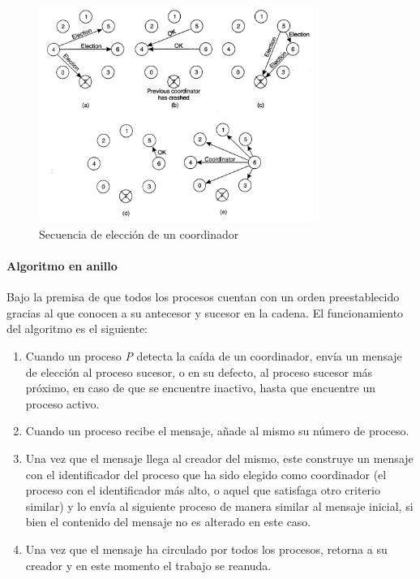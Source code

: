 \begin{figure}[H]
\centering
\includegraphics[width=0.8\textwidth]{Chapter2/Figures/bully}
\caption{Secuencia de elección de un coordinador}
\label{fig:tanenbaum:bully}
\end{figure}

\paragraph{Algoritmo en anillo}

Bajo la premisa de que todos los procesos cuentan con un orden preestablecido gracias al que conocen a su antecesor y sucesor en la cadena. El funcionamiento del algoritmo es el siguiente:

\begin{enumerate}
\item Cuando un proceso \textit{P} detecta la caída de un coordinador, envía un mensaje de elección al proceso sucesor, o en su defecto, al proceso sucesor más próximo, en caso de que se encuentre inactivo, hasta que encuentre un proceso activo.
\item Cuando un proceso recibe el mensaje, añade al mismo su número de proceso.
\item Una vez que el mensaje llega al creador del mismo, este construye un mensaje con el identificador del proceso que ha sido elegido como coordinador (el proceso con el identificador más alto, o aquel que satisfaga otro criterio similar) y lo envía al siguiente proceso de manera similar al mensaje inicial, si bien el contenido del mensaje no es alterado en este caso.
\item Una vez que el mensaje ha circulado por todos los procesos, retorna a su creador y en este momento el trabajo se reanuda.
\end{enumerate}

